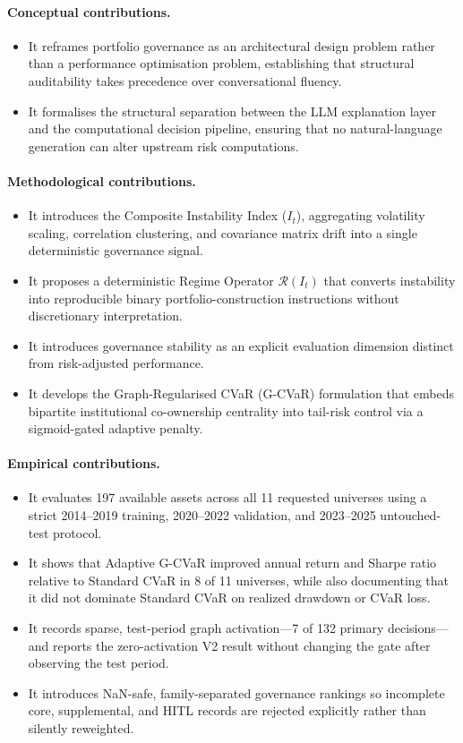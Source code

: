 \documentclass[11pt]{article}
\begin{document}
\paragraph{Conceptual contributions.}
\begin{itemize}
  \item It reframes portfolio governance as an architectural design problem rather than a performance optimisation problem, establishing that structural auditability takes precedence over conversational fluency.
  \item It formalises the structural separation between the LLM explanation layer and the computational decision pipeline, ensuring that no natural-language generation can alter upstream risk computations.
\end{itemize}

\paragraph{Methodological contributions.}
\begin{itemize}
  \item It introduces the Composite Instability Index ($I_t$), aggregating volatility scaling, correlation clustering, and covariance matrix drift into a single deterministic governance signal.
  \item It proposes a deterministic Regime Operator $\mathcal{R}(I_t)$ that converts instability into reproducible binary portfolio-construction instructions without discretionary interpretation.
  \item It introduces governance stability as an explicit evaluation dimension distinct from risk-adjusted performance.
  \item It develops the Graph-Regularised CVaR (G-CVaR) formulation that embeds bipartite institutional co-ownership centrality into tail-risk control via a sigmoid-gated adaptive penalty.
\end{itemize}

\paragraph{Empirical contributions.}
\begin{itemize}
  \item It evaluates 197 available assets across all 11 requested universes using a strict 2014--2019 training, 2020--2022 validation, and 2023--2025 untouched-test protocol.
  \item It shows that Adaptive G-CVaR improved annual return and Sharpe ratio relative to Standard CVaR in 8 of 11 universes, while also documenting that it did not dominate Standard CVaR on realized drawdown or CVaR loss.
  \item It records sparse, test-period graph activation---7 of 132 primary decisions---and reports the zero-activation V2 result without changing the gate after observing the test period.
  \item It introduces NaN-safe, family-separated governance rankings so incomplete core, supplemental, and HITL records are rejected explicitly rather than silently reweighted.
\end{itemize}
\end{document}
